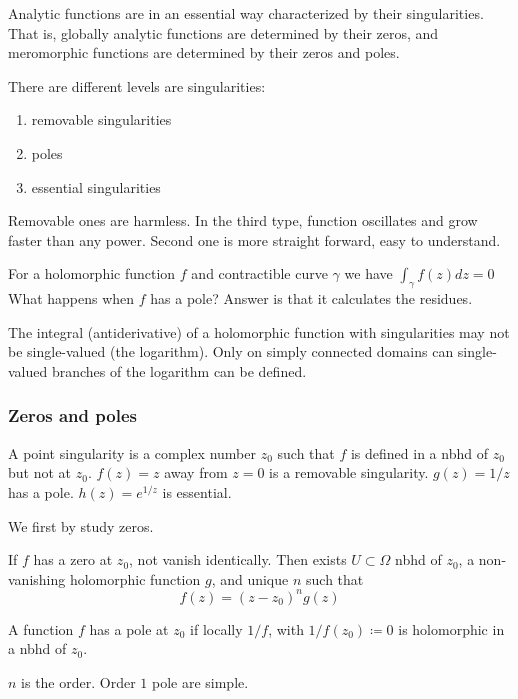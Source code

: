 \documentclass[main.tex]{subfiles}
\begin{document}
Analytic functions are in an essential way characterized by their singularities. That is, globally analytic functions are determined by their zeros, and meromorphic functions are determined by their zeros and poles. 

There are different levels are singularities:
\begin{enumerate}
    \item removable singularities
    \item poles
    \item essential singularities
\end{enumerate}
Removable ones are harmless. In the third type, function oscillates and grow faster than any power. Second one is more straight forward, easy to understand.

For a holomorphic function $f$ and contractible curve $\gamma$ we have 
$
\int_\gamma f(z) dz = 0
$
What happens when $f$ has a pole? Answer is that it calculates the residues.

The integral (antiderivative) of a holomorphic function with singularities may not be single-valued (the logarithm). Only on simply connected domains can single-valued branches of the logarithm can be defined.

\subsubsection{Zeros and poles}
A point singularity is a complex number $z_0$ such that $f$ is defined in a nbhd of $z_0$ but not at $z_0$. $f(z) = z$ away from $z = 0$ is a removable singularity. $g(z) = 1/z$ has a pole. $h(z) = e^{1/z}$ is essential.

We first by study zeros. 
\begin{theorem}
If $f$ has a zero at $z_0$, not vanish identically. Then exists $U \subset \Omega$ nbhd of $z_0$, a non-vanishing holomorphic function $g$, and unique $n$ such that 
$$
f(z) = (z - z_0)^n g(z)
$$
\end{theorem}

A function $f$ has a pole at $z_0$ if locally $1/f$, with $1/f(z_0) \coloneqq 0$ is holomorphic in a nbhd of $z_0$.

$n$ is the order. Order $1$ pole are simple.
\end{document}

